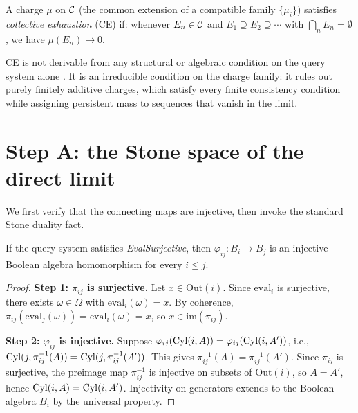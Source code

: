 \begin{definition}
A charge $\mu$ on $\mathcal{C}$ (the common extension of a compatible family $\{\mu_i\}$)
satisfies \emph{collective exhaustion} (CE) if: whenever $E_n \in \mathcal{C}$ and
$E_1 \supseteq E_2 \supseteq \cdots$ with $\bigcap_{n} E_n = \emptyset$, we have
$\mu(E_n) \to 0$.
\end{definition}

\begin{remark}
CE is not derivable from any structural or algebraic condition on the query system
alone \cite{mahon_paper0}.  It is an irreducible condition on the charge family: it
rules out purely finitely additive charges, which satisfy every finite consistency
condition while assigning persistent mass to sequences that vanish in the limit.
\end{remark}

\section{Step A: the Stone space of the direct limit}
\label{sec:stepA}

We first verify that the connecting maps are injective, then invoke the standard
Stone duality fact.

\begin{lemma}
\label{lem:phi_inj}
If the query system satisfies \emph{EvalSurjective}, then $\varphi_{ij} : B_i \to B_j$
is an injective Boolean algebra homomorphism for every $i \leq j$.
\end{lemma}

\begin{proof}
\textbf{Step 1: $\pi_{ij}$ is surjective.}
Let $x \in \mathrm{Out}(i)$.  Since $\mathrm{eval}_i$ is surjective, there exists
$\omega \in \Omega$ with $\mathrm{eval}_i(\omega) = x$.  By coherence,
$\pi_{ij}(\mathrm{eval}_j(\omega)) = \mathrm{eval}_i(\omega) = x$, so $x \in
\mathrm{im}(\pi_{ij})$.

\textbf{Step 2: $\varphi_{ij}$ is injective.}
Suppose $\varphi_{ij}(\mathrm{Cyl}(i,A)) = \varphi_{ij}(\mathrm{Cyl}(i,A'))$, i.e.,
$\mathrm{Cyl}(j,\pi_{ij}^{-1}(A)) = \mathrm{Cyl}(j,\pi_{ij}^{-1}(A'))$.  This gives
$\pi_{ij}^{-1}(A) = \pi_{ij}^{-1}(A')$.  Since $\pi_{ij}$ is surjective, the
preimage map $\pi_{ij}^{-1}$ is injective on subsets of $\mathrm{Out}(i)$, so
$A = A'$, hence $\mathrm{Cyl}(i,A) = \mathrm{Cyl}(i,A')$.  Injectivity on generators extends to
the Boolean algebra $B_i$ by the universal property.
\end{proof}

